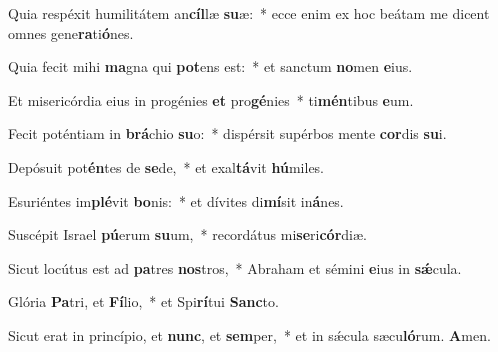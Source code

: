 \item Quia respéxit humilitátem an\textbf{cíl}læ \textbf{su}æ:~* ecce enim ex hoc beátam me dicent omnes gene\textbf{ra}ti\textbf{ó}nes.

\item Quia fecit mihi \textbf{ma}gna qui \textbf{pot}ens est:~* et sanctum \textbf{no}men \textbf{e}ius.

\item Et misericórdia eius in progénies \textbf{et} pro\textbf{gé}nies~* ti\textbf{mén}tibus \textbf{e}um.

\item Fecit poténtiam in \textbf{brá}chio \textbf{su}o:~* dispérsit supérbos mente \textbf{cor}dis \textbf{su}i.

\item Depósuit pot\textbf{én}tes de \textbf{se}de,~* et exal\textbf{tá}vit \textbf{hú}miles.

\item Esuriéntes im\textbf{plé}vit \textbf{bo}nis:~* et dívites di\textbf{mí}sit in\textbf{á}nes.

\item Suscépit Israel \textbf{pú}erum \textbf{su}um,~* recordátus mi\textbf{se}ri\textbf{cór}diæ.

\item Sicut locútus est ad \textbf{pa}tres \textbf{nos}tros,~* Abraham et sémini \textbf{e}ius in \textbf{sǽ}cula.

\item Glória \textbf{Pa}tri, et \textbf{Fí}lio,~* et Spi\textbf{rí}tui \textbf{Sanc}to.

\item Sicut erat in princípio, et \textbf{nunc}, et \textbf{sem}per,~* et in sǽcula sæcu\textbf{ló}rum. \textbf{A}men.